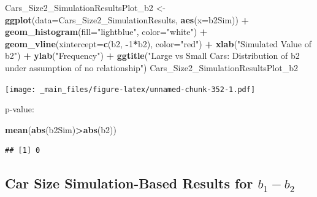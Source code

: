 \documentclass[]{book}
\newenvironment{Shaded}{\begin{snugshade}}{\end{snugshade}}
\newcommand{\KeywordTok}[1]{\textcolor[rgb]{0.13,0.29,0.53}{\textbf{#1}}}
\newcommand{\DataTypeTok}[1]{\textcolor[rgb]{0.13,0.29,0.53}{#1}}
\newcommand{\DecValTok}[1]{\textcolor[rgb]{0.00,0.00,0.81}{#1}}
\newcommand{\StringTok}[1]{\textcolor[rgb]{0.31,0.60,0.02}{#1}}
\newcommand{\OperatorTok}[1]{\textcolor[rgb]{0.81,0.36,0.00}{\textbf{#1}}}
\newcommand{\NormalTok}[1]{#1}
\begin{document}
\begin{Shaded}
\begin{Highlighting}[]
\NormalTok{Cars_Size2_SimulationResultsPlot_b2 <-}\StringTok{ }\KeywordTok{ggplot}\NormalTok{(}\DataTypeTok{data=}\NormalTok{Cars_Size2_SimulationResults, }\KeywordTok{aes}\NormalTok{(}\DataTypeTok{x=}\NormalTok{b2Sim)) }\OperatorTok{+}\StringTok{ }
\StringTok{  }\KeywordTok{geom_histogram}\NormalTok{(}\DataTypeTok{fill=}\StringTok{"lightblue"}\NormalTok{, }\DataTypeTok{color=}\StringTok{"white"}\NormalTok{) }\OperatorTok{+}\StringTok{ }
\StringTok{  }\KeywordTok{geom_vline}\NormalTok{(}\DataTypeTok{xintercept=}\KeywordTok{c}\NormalTok{(b2, }\OperatorTok{-}\DecValTok{1}\OperatorTok{*}\NormalTok{b2), }\DataTypeTok{color=}\StringTok{"red"}\NormalTok{) }\OperatorTok{+}\StringTok{ }
\StringTok{  }\KeywordTok{xlab}\NormalTok{(}\StringTok{"Simulated Value of b2"}\NormalTok{) }\OperatorTok{+}\StringTok{ }\KeywordTok{ylab}\NormalTok{(}\StringTok{"Frequency"}\NormalTok{) }\OperatorTok{+}\StringTok{ }
\StringTok{  }\KeywordTok{ggtitle}\NormalTok{(}\StringTok{"Large vs Small Cars: Distribution of b2 under assumption of no relationship"}\NormalTok{)}
\NormalTok{Cars_Size2_SimulationResultsPlot_b2}
\end{Highlighting}
\end{Shaded}

\texttt{[image: \_main\_files/figure-latex/unnamed-chunk-352-1.pdf]}

p-value:

\begin{Shaded}
\begin{Highlighting}[]
\KeywordTok{mean}\NormalTok{(}\KeywordTok{abs}\NormalTok{(b2Sim)}\OperatorTok{>}\KeywordTok{abs}\NormalTok{(b2))}
\end{Highlighting}
\end{Shaded}

\begin{verbatim}
## [1] 0
\end{verbatim}

\subsection{\texorpdfstring{Car Size Simulation-Based Results for
\(b_1-b_2\)}{Car Size Simulation-Based Results for b\_1-b\_2}}\label{car-size-simulation-based-results-for-b_1-b_2}
\end{document}
